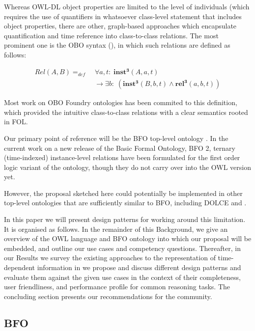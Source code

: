 \documentclass[10pt]{bmc_article}
\newcommand{\mirel}[1]{\ensuremath{\mathrm{\mathbf{#1}}}}
\newcommand{\mclass}[1]{\ensuremath{\mathit{#1}}}
\newcommand{\mrel}[2]{\mirel{#1^#2}}
\newcommand{\mrelt}[1]{\mrel{#1}{3}}
\newenvironment{bmcformat}{\baselineskip20pt\sloppy\setboolean{publ}{false}}{\baselineskip20pt\sloppy}
\begin{document}
\begin{bmcformat}
Whereas OWL-DL object properties are limited to the level of individuals (which 
requires the use of quantifiers in whatsoever class-level statement that includes
object properties, there are other, graph-based approaches which encapsulate quantification
and time reference into class-to-class relations. The most prominent one is 
the OBO syntax (\cite{OBO:RO}), in which such relations are defined as follows:

\begin{equation}
\begin{split}
\mclass{Rel}(\mclass{A},\mclass{B}) =_{def}&\;
\forall a, t:\; \mrelt{inst}(\mclass{A}, a, t) \\
&\ \rightarrow
\exists b:\;(\mrelt{inst}(\mclass{B},b,t) \wedge
\mrelt{rel}(a,b,t))
\end{split}
\label{eq:obo}
\end{equation}
 
Most work on OBO Foundry ontologies has been commited to this definition, which provided 
the intuitive class-to-class relations with a clear semantics rooted in FOL. 



Our primary point of reference will be the BFO top-level ontology \cite{BFO2:Graz}. 
In the current work on a new release of the Basic
Formal Ontology, BFO 2, ternary (time-indexed) instance-level relations have
been formulated for the first order logic variant of the ontology, though they
do not carry over into the OWL version yet.

 However,
the proposal sketched here could potentially be implemented in other top-level
ontologies that are sufficiently similar to BFO, including DOLCE \cite{DOLCE:ref} and \cite{GFO:ref}.

In this paper we will present design patterns for working around this limitation. It is organised as follows.
In the remainder of this Background, we give an overview of the OWL language and BFO ontology into which our proposal will be embedded, and outline our use cases and competency questions. 
Thereafter, in our Results we survey the existing approaches to the representation of time-dependent information in 
we propose and discuss different design patterns and evaluate them against the given use cases in the context of their completeness, user friendliness, and performance profile for common reasoning tasks.
The concluding section presents our recommendations for the community.

\subsection*{BFO}


\end{bmcformat}
\end{document}
